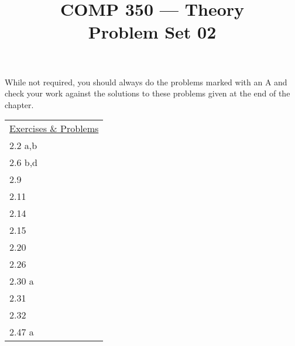\documentclass[nobib]{tufte-handout}
\title{COMP 350 --- Theory \\ Problem Set 02}
\begin{document}
\maketitle

While not required, you should always do the problems marked with an A and check your work against the solutions to these problems given at the end of the chapter.

\begin{center}
\begin{tabular}{l}
  \underline{Exercises \& Problems} \\
  2.2 a,b \\ %
  2.6 b,d \\ %
  2.9 \\ %
  2.11 \\ %
  2.14 \\ %
  2.15 \\ %
  2.20 \\ %
  2.26 \\ %
  2.30 a \\ %
  2.31 \\ %
  2.32 \\ %
  2.47 a \\ %
\end{tabular}
\end{center}
\end{document}
